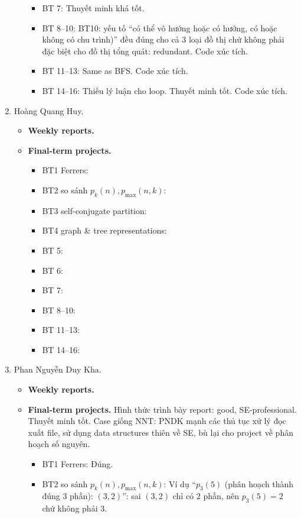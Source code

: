\documentclass{article}
\begin{document}
\begin{enumerate}
\begin{itemize}
\begin{itemize}
            \item BT 7: Thuyết minh khá tốt.
            \item BT 8--10: BT10: yếu tố ``có thể vô hướng hoặc có hướng, có hoặc không có chu trình)'' đều đúng cho cả 3 loại đồ thị chứ không phải đặc biệt cho đồ thị tổng quát: redundant. Code xúc tích.
            \item BT 11--13: Same as BFS. Code xúc tích.
            \item BT 14--16: Thiếu lý luận cho loop. Thuyết minh tốt. Code xúc tích.
        \end{itemize}
    \end{itemize}
    \item {\sc Hoàng Quang Huy.}
    \begin{itemize}
        \item {\bf Weekly reports.}
        \item {\bf Final-term projects.}
        \begin{itemize}
            \item BT1 Ferrers:
            \item BT2 so sánh $p_k(n),p_{\max}(n,k)$:
            \item BT3 self-conjugate partition:
            \item BT4 graph \& tree representations:
            \item BT 5:
            \item BT 6:
            \item BT 7:
            \item BT 8--10:
            \item BT 11--13:
            \item BT 14--16:
        \end{itemize}
    \end{itemize}
    \item {\sc Phan Nguyễn Duy Kha.}
    \begin{itemize}
        \item {\bf Weekly reports.}
        \item {\bf Final-term projects.} Hình thức trình bày report: good, SE-professional. Thuyết minh tốt. Case giống NNT: PNDK mạnh các thủ tục xử lý đọc xuất file, sử dụng data structures thiên về SE, bù lại cho project về phân hoạch số nguyên.
        \begin{itemize}
            \item BT1 Ferrers: Đúng.
            \item BT2 so sánh $p_k(n),p_{\max}(n,k)$: Ví dụ ``$p_3(5)$ (phân hoạch thành đúng 3 phần): \st{$(3,2)$}'': sai $(3,2)$ chỉ có 2 phần, nên $p_3(5) = 2$ chứ không phải 3.

\end{itemize}
\end{itemize}
\end{enumerate}
\end{document}
